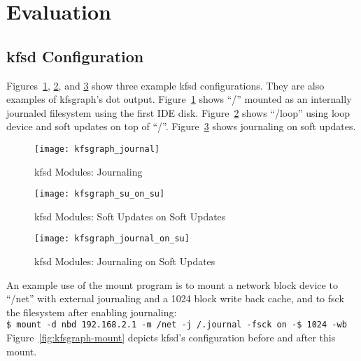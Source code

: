 \section{Evaluation}
\label{sec:eval}

\subsection{kfsd Configuration}
\label{sec:eval:configuration}

\newcommand{\kfsgraphscale}{0.5}

Figures~\ref{fig:kfsgraph-journal}, \ref{fig:kfsgraph-su-on-su}, and
\ref{fig:kfsgraph-journal-on-su} show three example kfsd configurations. They
are also examples of kfsgraph's dot output. Figure~\ref{fig:kfsgraph-journal}
shows ``/'' mounted as an internally journaled filesystem using the first IDE
disk. Figure~\ref{fig:kfsgraph-su-on-su} shows ``/loop'' using loop device and
soft updates on top of ``/''. Figure~\ref{fig:kfsgraph-journal-on-su} shows
journaling on soft updates.

\begin{figure}[htb]
\begin{center}
  \texttt{[image: kfsgraph\_journal]}
  \caption{kfsd Modules: Journaling}
  \label{fig:kfsgraph-journal}
\end{center}
\end{figure}

\begin{figure}[htb]
\begin{center}
  \texttt{[image: kfsgraph\_su\_on\_su]}
  \caption{kfsd Modules: Soft Updates on Soft Updates}
  \label{fig:kfsgraph-su-on-su}
\end{center}
\end{figure}

\begin{figure}[htb]
\begin{center}
  \texttt{[image: kfsgraph\_journal\_on\_su]}
  \caption{kfsd Modules: Journaling on Soft Updates}
  \label{fig:kfsgraph-journal-on-su}
\end{center}
\end{figure}

An example use of the mount program is to mount a network block device to
``/net'' with external journaling and a 1024 block write back cache, and to
fsck the filesystem after enabling journaling:\\
\indent \texttt{\$ mount -d nbd 192.168.2.1 -m /net -j /.journal -fsck on -\$ 1024 -wb}\\
Figure~\ref{fig:kfsgraph-mount} depicts kfsd's configuration before and after
this mount.

